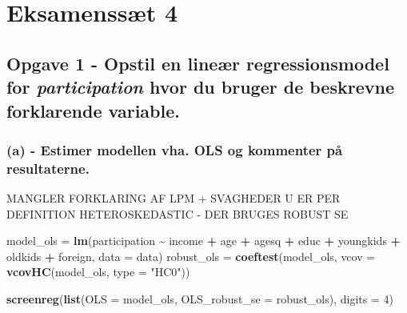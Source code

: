 \documentclass[
]{article}
\author{}
\date{\vspace{-2.5em}}
\newenvironment{Shaded}{\begin{snugshade}}{\end{snugshade}}
\newcommand{\AttributeTok}[1]{\textcolor[rgb]{0.13,0.29,0.53}{#1}}
\newcommand{\DecValTok}[1]{\textcolor[rgb]{0.00,0.00,0.81}{#1}}
\newcommand{\FunctionTok}[1]{\textcolor[rgb]{0.13,0.29,0.53}{\textbf{#1}}}
\newcommand{\NormalTok}[1]{#1}
\newcommand{\OtherTok}[1]{\textcolor[rgb]{0.56,0.35,0.01}{#1}}
\newcommand{\SpecialCharTok}[1]{\textcolor[rgb]{0.81,0.36,0.00}{\textbf{#1}}}
\newcommand{\StringTok}[1]{\textcolor[rgb]{0.31,0.60,0.02}{#1}}
\begin{document}
\hypertarget{eksamenssuxe6t-4}{%
\section{Eksamenssæt 4}\label{eksamenssuxe6t-4}}

\hypertarget{opgave-1---opstil-en-lineuxe6r-regressionsmodel-for-hvor-du-bruger-de-beskrevne-forklarende-variable.}{%
\subsection{\texorpdfstring{Opgave 1 - Opstil en lineær regressionsmodel
for \textit{participation} hvor du bruger de beskrevne forklarende
variable.}{Opgave 1 - Opstil en lineær regressionsmodel for  hvor du bruger de beskrevne forklarende variable.}}\label{opgave-1---opstil-en-lineuxe6r-regressionsmodel-for-hvor-du-bruger-de-beskrevne-forklarende-variable.}}

\hypertarget{a---estimer-modellen-vha.-ols-og-kommenter-puxe5-resultaterne.}{%
\subsubsection{(a) - Estimer modellen vha. OLS og kommenter på
resultaterne.}\label{a---estimer-modellen-vha.-ols-og-kommenter-puxe5-resultaterne.}}

MANGLER FORKLARING AF LPM + SVAGHEDER U ER PER DEFINITION
HETEROSKEDASTIC - DER BRUGES ROBUST SE

\begin{Shaded}
\begin{Highlighting}[]
\NormalTok{model\_ols }\OtherTok{=} \FunctionTok{lm}\NormalTok{(participation }\SpecialCharTok{\textasciitilde{}}\NormalTok{ income }\SpecialCharTok{+}\NormalTok{ age }\SpecialCharTok{+}\NormalTok{ agesq }\SpecialCharTok{+}\NormalTok{ educ }\SpecialCharTok{+}\NormalTok{ youngkids }\SpecialCharTok{+}\NormalTok{ oldkids }\SpecialCharTok{+}\NormalTok{ foreign, }\AttributeTok{data =}\NormalTok{ data)}
\NormalTok{robust\_ols }\OtherTok{=} \FunctionTok{coeftest}\NormalTok{(model\_ols, }\AttributeTok{vcov =} \FunctionTok{vcovHC}\NormalTok{(model\_ols, }\AttributeTok{type =} \StringTok{"HC0"}\NormalTok{))}

\FunctionTok{screenreg}\NormalTok{(}\FunctionTok{list}\NormalTok{(}\AttributeTok{OLS =}\NormalTok{ model\_ols, }\AttributeTok{OLS\_robust\_se =}\NormalTok{ robust\_ols), }\AttributeTok{digits =} \DecValTok{4}\NormalTok{)}
\end{Highlighting}
\end{Shaded}
\end{document}
